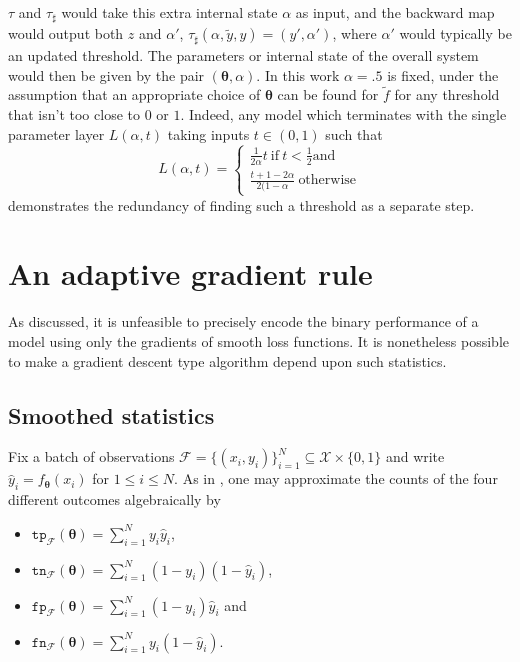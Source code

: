 \documentclass[10pt,a4paper]{article}
\begin{document}
$\tau$ and $\tau_\sharp$ would take this extra internal state $\alpha$ as input, and the backward map would output both $z$ and $\alpha'$, $\tau_\sharp(\alpha,\tilde y,y)=(y',\alpha')$, where $\alpha'$ would typically be an updated threshold.
The parameters or internal state of the overall system would then be given by the pair $(\boldsymbol\theta,\alpha)$.
In this work $\alpha=.5$ is fixed, under the assumption that an appropriate choice of $\boldsymbol\theta$ can be found for $\tilde f$ for any threshold that isn't too close to $0$ or $1$.
Indeed, any model which terminates with the single parameter layer $L(\alpha,t)$ taking inputs $t\in(0,1)$ such that
$$
L(\alpha,t)=\begin{cases}\tfrac1{2\alpha}t~\text{if}~t<\tfrac12\text{and}\\\tfrac{t+1-2\alpha}{2(1-\alpha}~\text{otherwise}\end{cases}
$$
demonstrates the redundancy of finding such a threshold as a separate step.
\section{An adaptive gradient rule}

As discussed, it is unfeasible to precisely encode the binary performance of a model using only the gradients of smooth loss functions.
It is nonetheless possible to make a gradient descent type algorithm depend upon such statistics.

\subsection{Smoothed statistics}

Fix a batch of observations $\mathcal F=\{(x_i,y_i)\}_{i=1}^N\subseteq\mathcal X\times\{0,1\}$ and write $\hat y_i=f_{\boldsymbol\theta}(x_i)$ for $1\leq i\leq N$.
As in \cite{lee2021surrogate}, one may  approximate the counts of the four different outcomes algebraically by
\begin{itemize}
  \item $\texttt{tp}_\mathcal F(\boldsymbol\theta)=\sum_{i=1}^N y_i\hat y_i$,
  \item $\texttt{tn}_\mathcal F(\boldsymbol\theta)=\sum_{i=1}^N(1-y_i)(1-\hat y_i)$,
  \item $\texttt{fp}_\mathcal F(\boldsymbol\theta)=\sum_{i=1}^N(1-y_i)\hat y_i$ and
  \item $\texttt{fn}_\mathcal F(\boldsymbol\theta)=\sum_{i=1}^Ny_i(1-\hat y_i)$.
\end{itemize}
\end{document}
